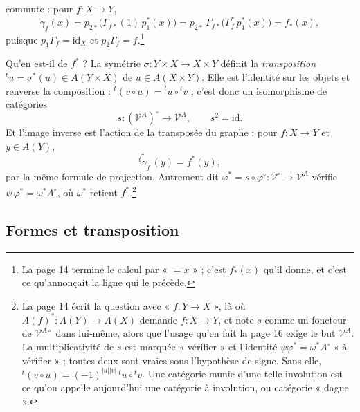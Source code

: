 \documentclass[11pt,a4paper]{article}
\begin{document}
commute : pour $f \colon X \to Y$,
\[ \tilde{\gamma}_{f}(x) = p_{2*}\bigl(\Gamma_{f*}(1)\, p_{1}^{*}(x)\bigr) = p_{2*}\,\Gamma_{f*}\bigl(\Gamma_{f}^{*}\, p_{1}^{*}(x)\bigr) = f_{*}(x) , \]
puisque $p_{1}\Gamma_{f} = \mathrm{id}_{X}$ et
$p_{2}\Gamma_{f} = f$.\footnote{La page 14 termine le calcul par « $= x$ » ;
c'est $f_{*}(x)$ qu'il donne, et c'est ce qu'annonçait la ligne qui le
précède.}

Qu'en est-il de $f^{*}$ ? La symétrie $\sigma \colon Y \times X \to X \times Y$
définit la \emph{transposition}
${}^{t}u = \sigma^{*}(u) \in A(Y \times X)$ de $u \in A(X \times Y)$. Elle est
l'identité sur les objets et renverse la composition :
${}^{t}(v \circ u) = {}^{t}u \circ {}^{t}v$ ; c'est donc un isomorphisme de
catégories
\[ s \colon (\mathcal{V}^{A})^{\circ} \longrightarrow \mathcal{V}^{A} , \qquad s^{2} = \mathrm{id} . \]
Et l'image inverse est l'action de la transposée du graphe : pour
$f \colon X \to Y$ et $y \in A(Y)$,
\[ \widetilde{{}^{t}\gamma_{f}}\,(y) = f^{*}(y) , \]
par la même formule de projection. Autrement dit
$\varphi^{*} = s \circ \varphi^{\circ} \colon \mathcal{V}^{\circ} \to \mathcal{V}^{A}$
vérifie $\psi\, \varphi^{*} = \omega^{*} A^{\circ}$, où $\omega^{*}$ retient
$f^{*}$.\footnote{La page 14 écrit la question avec « $f \colon Y \to X$ », là
où $A(f)^{*} \colon A(Y) \to A(X)$ demande $f \colon X \to Y$, et note $s$
comme un foncteur de $\mathcal{V}^{A\circ}$ dans lui-même, alors que l'usage
qu'en fait la page 16 exige le but $\mathcal{V}^{A}$. La multiplicativité de
$s$ est marquée « vérifier » et l'identité $\psi\varphi^{*} = \omega^{*}A^{\circ}$
« à vérifier » ; toutes deux sont vraies sous l'hypothèse de signe. Sans elle,
${}^{t}(v \circ u) = (-1)^{|u||v|}\, {}^{t}u \circ {}^{t}v$. Une catégorie munie
d'une telle involution est ce qu'on appelle aujourd'hui une catégorie à
involution, ou catégorie « dague ».}

\subsection*{Formes et transposition}
\end{document}
